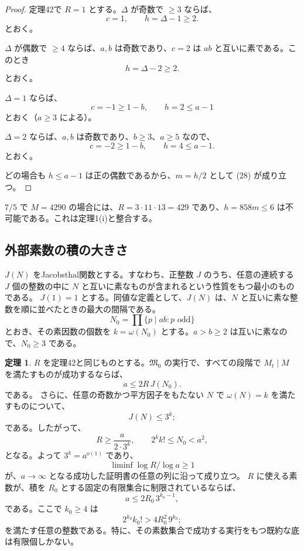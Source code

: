 \documentclass[11pt,reqno]{amsart}
\theoremstyle{definition}
\newtheorem{theorem}{定理}
\theoremstyle{definition}
\theoremstyle{remark}
\begin{document}
\begin{proof}\leavevmode\label{proof:43}
定理42で \(R=1\) とする。\(\Delta\) が奇数で \(\ge3\) ならば、
\[
c=1,\qquad h=\Delta-1\ge2.
\]
とおく。

\(\Delta\) が偶数で \(\ge4\) ならば、\(a,b\) は奇数であり、\(c=2\) は \(ab\) と互いに素である。このとき
\[
h=\Delta-2\ge2.
\]
とおく。

\(\Delta=1\) ならば、
\[
c=-1\ge1-b,\qquad h=2\le a-1
\]
とおく（\(a\ge3\) による）。

\(\Delta=2\) ならば、\(a,b\) は奇数であり、\(b\ge3\)、\(a\ge5\) なので、
\[
c=-2\ge1-b,\qquad h=4\le a-1.
\]
とおく。

どの場合も \(h\le a-1\) は正の偶数であるから、\(m=h/2\) として (28) が成り立つ。\qedhere
\end{proof}

\(7/5\) で \(M=4290\) の場合には、\(R=3\cdot11\cdot13=429\) であり、\(h=858m\le6\) は不可能である。これは定理1(i)と整合する。

\subsection{外部素数の積の大きさ}\label{sec:8.4}

\(J(N)\) をJacobsthal関数とする。すなわち、正整数 \(J\) のうち、任意の連続する \(J\) 個の整数の中に \(N\) と互いに素なものが含まれるという性質をもつ最小のものである。
\(J(1)=1\) とする。同値な定義として、\(J(N)\) は、\(N\) と互いに素な整数を順に並べたときの最大の間隔である。
\[
N_0=\prod\{p\mid ab:p\text{ odd}\}
\]
とおき、その素因数の個数を \(k=\omega(N_0)\) とする。\(a>b\ge2\) は互いに素なので、\(N_0\ge3\) である。

\begin{samepage}
\begin{theorem}\leavevmode\label{thm:44}
\(R\) を定理42と同じものとする。\(\mathfrak M_0\) の実行で、すべての段階で \(M_t\mid M\) を満たすものが成功するならば、
\[
a\le2R\,J(N_0).
\tag{29}\label{eq:29}
\]
である。
さらに、任意の奇数かつ平方因子をもたない \(N\) で \(\omega(N)=k\) を満たすものについて、
\[
J(N)\le3^k;
\]
である。したがって、
\[
R\ge\frac{a}{2\cdot3^{k}},\qquad 2^kk!\le N_0<a^2,
\tag{30}\label{eq:30}
\]
となる。よって \(3^k=a^{o(1)}\) であり、
\[
\liminf\log R/\log a\ge1
\]
が、\(a\to\infty\) となる成功した証明書の任意の列に沿って成り立つ。
\(R\) に使える素数が、積を \(R_0\) とする固定の有限集合に制限されているならば、
\[
a\le2R_0\,3^{k_0-1},
\]
である。ここで \(k_0\ge4\) は
\[
2^{k_0}k_0!>4R_0^2\,9^{k_0};
\]
を満たす任意の整数である。特に、その素数集合で成功する実行をもつ既約な底は有限個しかない。
\label{thm-end:44}
\end{theorem}
\end{samepage}
\end{document}

